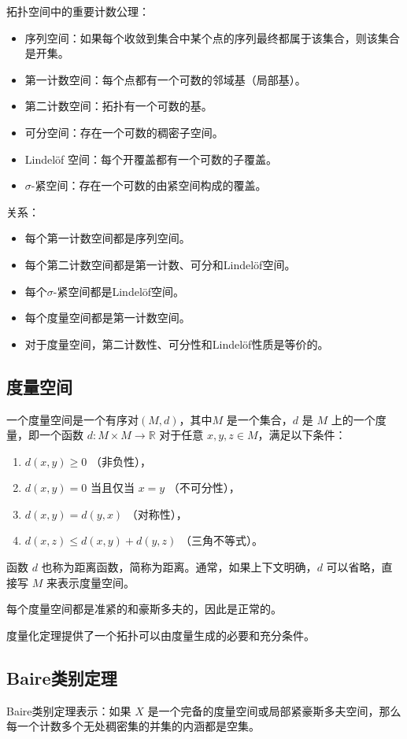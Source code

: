 拓扑空间中的重要计数公理：
\begin{itemize}
\item 序列空间：如果每个收敛到集合中某个点的序列最终都属于该集合，则该集合是开集。
\item 第一计数空间：每个点都有一个可数的邻域基（局部基）。
\item 第二计数空间：拓扑有一个可数的基。
\item 可分空间：存在一个可数的稠密子空间。
\item Lindelöf 空间：每个开覆盖都有一个可数的子覆盖。
\item $\sigma$-紧空间：存在一个可数的由紧空间构成的覆盖。
\end{itemize}
关系：
\begin{itemize}
\item 每个第一计数空间都是序列空间。
\item 每个第二计数空间都是第一计数、可分和Lindelöf空间。
\item 每个$\sigma$-紧空间都是Lindelöf空间。
\item 每个度量空间都是第一计数空间。
\item 对于度量空间，第二计数性、可分性和Lindelöf性质是等价的。
\end{itemize}
\subsection{度量空间}
一个度量空间是一个有序对$(M, d)$，其中$M$ 是一个集合，$d$ 是 $M$ 上的一个度量，即一个函数
$d: M \times M \to \mathbb{R}$
对于任意 $x, y, z \in M$，满足以下条件：
\begin{enumerate}
\item $d(x, y) \geq 0$ （非负性），
\item $d(x, y) = 0$ 当且仅当 $x = y$ （不可分性），
\item $d(x, y) = d(y, x)$ （对称性），
\item $d(x, z) \leq d(x, y) + d(y, z)$ （三角不等式）。
\end{enumerate}
函数 $d$ 也称为距离函数，简称为距离。通常，如果上下文明确，$d$ 可以省略，直接写 $M$ 来表示度量空间。

每个度量空间都是准紧的和豪斯多夫的，因此是正常的。

度量化定理提供了一个拓扑可以由度量生成的必要和充分条件。
\subsection{Baire类别定理}
Baire类别定理表示：如果 $X$ 是一个完备的度量空间或局部紧豪斯多夫空间，那么每一个计数多个无处稠密集的并集的内涵都是空集。

